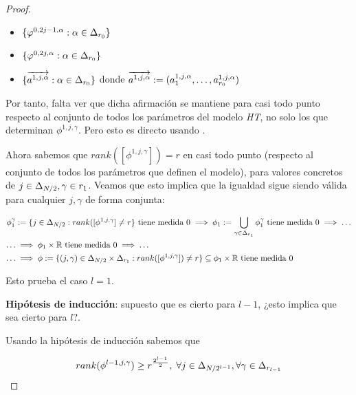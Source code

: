 \begin{proof}
    \begin{itemize}
        \item $\{ \varphi^{0, 2j - 1, \alpha}: \alpha \in \Delta_{r_0} \}$
        \item $\{ \varphi^{0, 2j, \alpha}: \alpha \in \Delta_{r_0} \}$
        \item $\{ \overrightarrow{a^{1, j, \alpha}} : \alpha \in \Delta_{r_0} \}$ donde $\overrightarrow{a^{1, j, \alpha}} := (a^{1, j, \alpha}_1, \ldots,  a^{1, j, \alpha}_{r_0})$
    \end{itemize}

    Por tanto, falta ver que dicha afirmación se mantiene para casi todo punto respecto al conjunto de todos los parámetros del modelo \textit{HT}, no solo los que determinan $\phi^{1, j, \gamma}$. Pero esto es directo usando .

    Ahora sabemos que $rank([\phi^{1, j, \gamma}]) = r$ en casi todo punto (respecto al conjunto de todos los parámetros que definen el modelo), para valores concretos de $j \in \Delta_{N/2}, \gamma \in r_1$. Veamos que esto implica que la igualdad sigue siendo válida para cualquier $j, \gamma$ de forma conjunta:

    \begin{equation}
    \begin{split}
        \phi_1^\gamma &:= \{ j \in \Delta_{N/2}: rank([\phi^{1, j, \gamma}] \neq r \} \text{ tiene medida } 0 \implies \phi_1 := \bigcup_{\gamma \in \Delta_{r_1}} \phi_1^\gamma \text{ tiene medida } 0 \implies \ldots \\
        \ldots &\implies \phi_1 \times \mathbb{R} \text{ tiene medida } 0 \implies \ldots \\
        \ldots &\implies \phi := \{ (j, \gamma) \in \Delta_{N/2} \times \Delta_{r_1}: rank([\phi^{1, j, \gamma}]) \neq r \} \subseteq \phi_1 \times \mathbb{R} \text{ tiene medida } 0
    \end{split}
    \end{equation}

    Esto prueba el caso $l = 1$.

    \textbf{Hipótesis de inducción}: supuesto que es cierto para $l - 1$, ¿esto implica que sea cierto para $l$?.

    Usando la hipótesis de inducción sabemos que

    \begin{equation}
        rank(\phi^{l-1, j, \gamma}) \geq r^{\frac{2^{l - 1}}{2}},
        \; \forall j \in \Delta_{N/2^{l-1}}, \forall \gamma \in \Delta_{r_{l-1}}
    \end{equation}


\end{proof}
